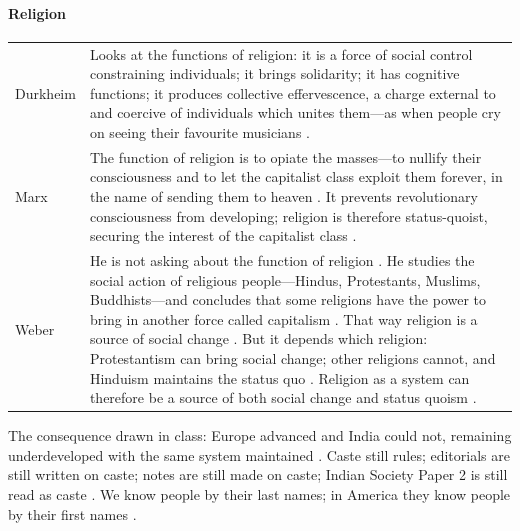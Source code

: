 \paragraph{Religion}
\vspace{6pt}
\noindent
\begin{tabularx}{\textwidth}{>{\hsize}Y >{\hsize}Y}
\toprule
{}
 &  \\
\midrule
Durkheim & Looks at the functions of religion: it is a force of social control constraining individuals; it brings solidarity; it has cognitive functions; it produces collective effervescence, a charge external to and coercive of individuals which unites them---as when people cry on seeing their favourite musicians . \\
\midrule
Marx & The function of religion is to opiate the masses---to nullify their consciousness and to let the capitalist class exploit them forever, in the name of sending them to heaven . It prevents revolutionary consciousness from developing; religion is therefore status-quoist, securing the interest of the capitalist class . \\
\midrule
Weber & He is not asking about the function of religion . He studies the social action of religious people---Hindus, Protestants, Muslims, Buddhists---and concludes that some religions have the power to bring in another force called capitalism . That way religion is a source of social change . But it depends which religion: Protestantism can bring social change; other religions cannot, and Hinduism maintains the status quo . Religion as a system can therefore be a source of both social change and status quoism . \\
\bottomrule
\end{tabularx}
\vspace{6pt}

\begin{CriticalPoint}
The consequence drawn in class: Europe advanced and India could not, remaining underdeveloped with the same system maintained . Caste still rules; editorials are still written on caste; notes are still made on caste; Indian Society Paper 2 is still read as caste .
We know people by their last names; in America they know people by their first names .
\end{CriticalPoint}

